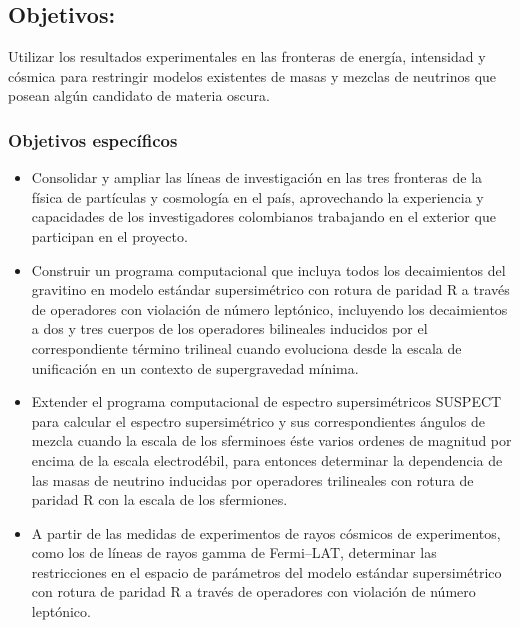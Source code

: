 \subsection{Objetivos:                                     }
Utilizar los resultados experimentales en las fronteras de energía,
intensidad y cósmica para restringir modelos existentes de masas y
mezclas de neutrinos que posean algún candidato de materia oscura.

\subsubsection{Objetivos específicos}


\begin{itemize}
\item Consolidar y ampliar las líneas de investigación en las tres
  fronteras de la física de partículas y cosmología en el país,
  aprovechando la experiencia y capacidades de los investigadores
  colombianos trabajando en el exterior que participan en el proyecto.
\item 
\begin{gravitinodm}
  Construir un programa computacional que incluya todos los
  decaimientos del gravitino en modelo estándar supersimétrico con
  rotura de paridad R a través de operadores con violación de número
  leptónico, incluyendo los decaimientos a dos y tres cuerpos de los
  operadores bilineales inducidos por el correspondiente término
  trilineal cuando evoluciona desde la escala de unificación en un
  contexto de supergravedad mínima.
\end{gravitinodm}

\item 
\begin{gravitinodm}
  Extender el programa computacional de espectro supersimétricos
  SUSPECT~\cite{a} para calcular el espectro supersimétrico y sus
  correspondientes ángulos de mezcla cuando la escala de los
  sferminoes éste varios ordenes de magnitud por encima de la escala
  electrodébil, para entonces determinar la dependencia de las masas
  de neutrino inducidas por operadores trilineales con rotura de
  paridad R con la escala de los sfermiones.
\end{gravitinodm}


\item 
\begin{gravitinodm}
  A partir de las medidas de experimentos de rayos cósmicos de
  experimentos, como los de líneas de rayos gamma de Fermi--LAT,
  determinar las restricciones en el espacio de parámetros del modelo
  estándar supersimétrico con rotura de paridad R a través de
  operadores con violación de número leptónico.
\end{gravitinodm}


\end{itemize}
